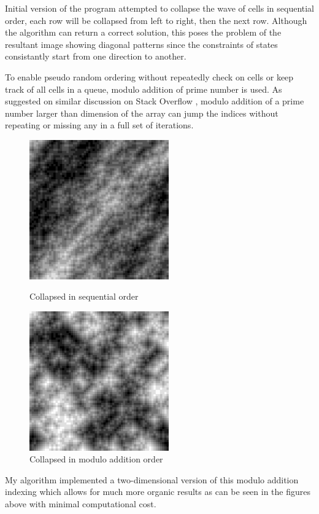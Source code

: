 
Initial version of the program attempted to collapse the wave of cells in sequential order, each row will be collapsed from left to right, then the next row. Although the algorithm can return a correct solution, this poses the problem of the resultant image showing diagonal patterns since the constraints of states consistantly start from one direction to another. 

To enable pseudo random ordering without repeatedly check on cells or keep track of all cells in a queue, modulo addition of prime number is used. As suggested on similar discussion on Stack Overflow \cite{modulo_addition}, modulo addition of a prime number larger than dimension of the array can jump the indices without repeating or missing any in a full set of iterations. 

\begin{figure}[!htb]
    \centering
    \includegraphics[height=6cm,keepaspectratio]{images/saved_result (scan).png}
    \caption{Collapsed in sequential order}
    \endminipage\hfill
    \centering
    \includegraphics[height=6cm,keepaspectratio]{images/saved_result 64_2.png}
    \caption{Collapsed in modulo addition order}
    \endminipage\hfill
\end{figure}

My algorithm implemented a two-dimensional version of this modulo addition indexing which allows for much more organic results as can be seen in the figures above with minimal computational cost.